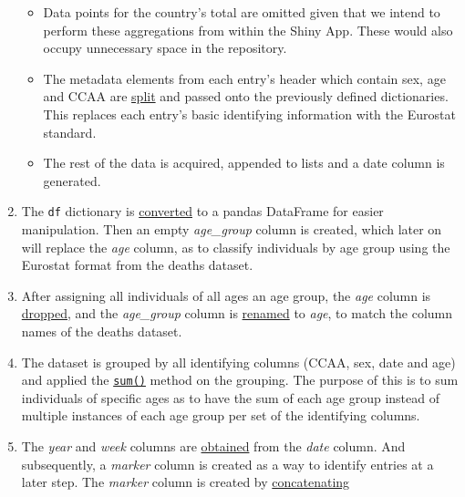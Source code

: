 \documentclass[
  a4paper]{article}
\begin{document}
\begin{enumerate}
  \begin{itemize}
  \item
    Data points for the country's total are omitted given that we intend
    to perform these aggregations from within the Shiny App. These would
    also occupy unnecessary space in the repository.
  \item
    The metadata elements from each entry's header which contain sex,
    age and CCAA are
    \href{https://github.com/dreth/tfm_uc3m/blob/report_ref/api/functions.py\#L251}{split}
    and passed onto the previously defined dictionaries. This replaces
    each entry's basic identifying information with the Eurostat
    standard.
  \item
    The rest of the data is acquired, appended to lists and a date
    column is generated.
  \end{itemize}
\item
  The \texttt{df} dictionary is
  \href{https://github.com/dreth/tfm_uc3m/blob/report_ref/api/functions.py\#L282}{converted}
  to a pandas DataFrame for easier manipulation. Then an empty
  \emph{age\_group} column is created, which later on will replace the
  \emph{age} column, as to classify individuals by age group using the
  Eurostat format from the deaths dataset.
\item
  After assigning all individuals of all ages an age group, the
  \emph{age} column is
  \href{https://github.com/dreth/tfm_uc3m/blob/report_ref/api/functions.py\#L297}{dropped},
  and the \emph{age\_group} column is
  \href{https://github.com/dreth/tfm_uc3m/blob/report_ref/api/functions.py\#L298}{renamed}
  to \emph{age}, to match the column names of the deaths dataset.
\item
  The dataset is grouped by all identifying columns (CCAA, sex, date and
  age) and applied the
  \href{https://github.com/dreth/tfm_uc3m/blob/report_ref/api/functions.py\#L301}{\texttt{sum()}}
  method on the grouping. The purpose of this is to sum individuals of
  specific ages as to have the sum of each age group instead of multiple
  instances of each age group per set of the identifying columns.
\item
  The \emph{year} and \emph{week} columns are
  \href{https://github.com/dreth/tfm_uc3m/blob/report_ref/api/functions.py\#L304-L307}{obtained}
  from the \emph{date} column. And subsequently, a \emph{marker} column
  is created as a way to identify entries at a later step. The
  \emph{marker} column is created by
  \href{https://github.com/dreth/tfm_uc3m/blob/report_ref/api/functions.py\#L310}{concatenating}

\end{enumerate}
\end{document}
